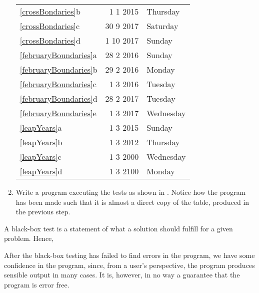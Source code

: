 \begin{enumerate}[label=]
\begin{center}
\begin{tabular}{|l|r|l|}
    \ref{crossBondaries}b&1 1 2015&Thursday\\
    \ref{crossBondaries}c&30 9 2017&Saturday\\
    \ref{crossBondaries}d&1 10 2017&Sunday\\
    \hline
    \ref{februaryBoundaries}a&28 2 2016&Sunday\\
    \ref{februaryBoundaries}b&29 2 2016&Monday\\
    \ref{februaryBoundaries}c&1 3 2016&Tuesday\\
    \ref{februaryBoundaries}d&28 2 2017&Tuesday\\
    \ref{februaryBoundaries}e&1 3 2017&Wednesday\\
    \hline
    \ref{leapYears}a&1 3 2015&Sunday\\
    \ref{leapYears}b&1 3 2012&Thursday\\
    \ref{leapYears}c&1 3 2000&Wednesday\\
    \ref{leapYears}d&1 3 2100&Monday\\
    \hline
  \end{tabular}
\end{center}
\item Write a program executing the tests as shown in .
% 
%
%
Notice how the program has been made such that it is almost a direct copy of the table, produced in the previous step.
\end{enumerate}
A black-box test is a statement of what a solution should fulfill for a given problem. Hence, 

After the black-box testing has failed to find errors in the program, we have some confidence in the program, since, from a user's perspective, the program produces sensible output in many cases. It is, however, in no way a guarantee that the program is error free.

